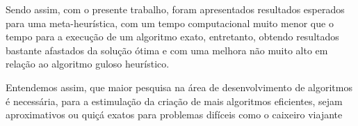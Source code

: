 Sendo assim, com o presente trabalho, foram apresentados resultados esperados para uma meta-heurística, com um tempo computacional muito menor que o tempo para a execução de um algoritmo exato, entretanto, obtendo resultados bastante afastados da solução ótima e com uma melhora não muito alto em relação ao algoritmo guloso heurístico.

Entendemos assim, que maior pesquisa na área de desenvolvimento de algoritmos é necessária, para a estimulação da criação de mais algoritmos eficientes, sejam aproximativos ou quiçá exatos para problemas difíceis como o caixeiro viajante